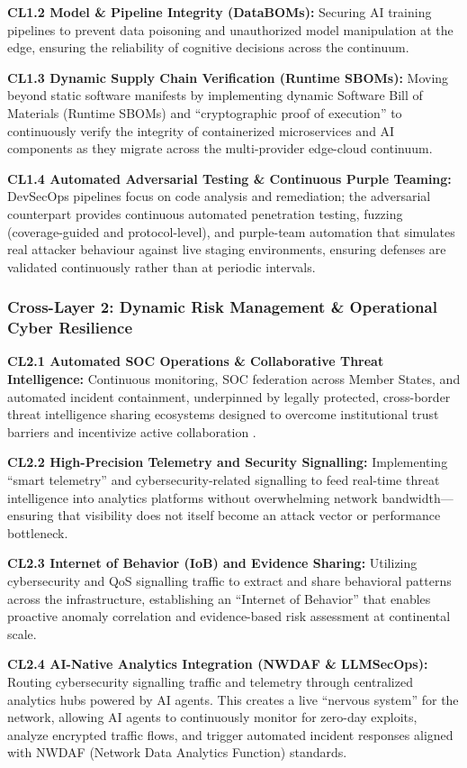 \documentclass[12pt,a4paper]{report}
\begin{document}
\textbf{CL1.2 Model \& Pipeline Integrity (DataBOMs):} Securing AI training pipelines to prevent data poisoning and unauthorized model manipulation at the edge, ensuring the reliability of cognitive decisions across the continuum.

\textbf{CL1.3 Dynamic Supply Chain Verification (Runtime SBOMs):} Moving beyond static software manifests by implementing dynamic Software Bill of Materials (Runtime SBOMs) and ``cryptographic proof of execution'' to continuously verify the integrity of containerized microservices and AI components as they migrate across the multi-provider edge-cloud continuum.

\textbf{CL1.4 Automated Adversarial Testing \& Continuous Purple Teaming:} DevSecOps pipelines focus on code analysis and remediation; the adversarial counterpart provides continuous automated penetration testing, fuzzing (coverage-guided and protocol-level), and purple-team automation that simulates real attacker behaviour against live staging environments, ensuring defenses are validated continuously rather than at periodic intervals.

\subsubsection*{Cross-Layer 2: Dynamic Risk Management \& Operational Cyber Resilience}
\textbf{CL2.1 Automated SOC Operations \& Collaborative Threat Intelligence:} Continuous monitoring, SOC federation across Member States, and automated incident containment, underpinned by legally protected, cross-border threat intelligence sharing ecosystems designed to overcome institutional trust barriers and incentivize active collaboration \cite{concordia}.

\textbf{CL2.2 High-Precision Telemetry and Security Signalling:} Implementing ``smart telemetry'' and cybersecurity-related signalling to feed real-time threat intelligence into analytics platforms without overwhelming network bandwidth---ensuring that visibility does not itself become an attack vector or performance bottleneck.

\textbf{CL2.3 Internet of Behavior (IoB) and Evidence Sharing:} Utilizing cybersecurity and QoS signalling traffic to extract and share behavioral patterns across the infrastructure, establishing an ``Internet of Behavior'' that enables proactive anomaly correlation and evidence-based risk assessment at continental scale.

\textbf{CL2.4 AI-Native Analytics Integration (NWDAF \& LLMSecOps):} Routing cybersecurity signalling traffic and telemetry through centralized analytics hubs powered by AI agents. This creates a live ``nervous system'' for the network, allowing AI agents to continuously monitor for zero-day exploits, analyze encrypted traffic flows, and trigger automated incident responses aligned with NWDAF (Network Data Analytics Function) standards.
\end{document}
